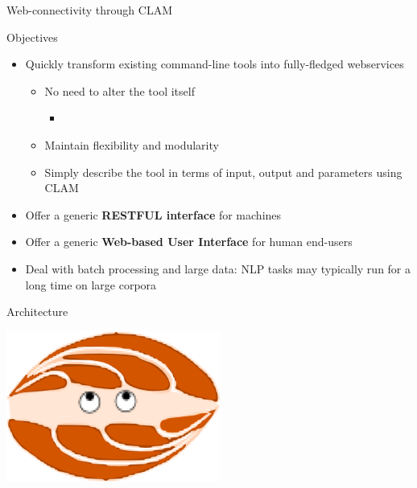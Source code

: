 \documentclass[xcolor=table,10pt,t]{beamer}
\begin{document}
\begin{frame}{Web-connectivity through CLAM}
  \begin{block}{Objectives}
      \begin{itemize}
        \item Quickly transform existing command-line tools into fully-fledged webservices
        \begin{itemize}
            \item No need to alter the tool itself
            \begin{itemize}
                \item {}
            \end{itemize}
            \item Maintain flexibility and modularity
            \item Simply describe the tool in terms of input, output and
                parameters using CLAM
        \end{itemize}
        \item Offer a generic \textbf{RESTFUL interface} for machines
        \item Offer a generic \textbf{Web-based User Interface} for human end-users
        \item Deal with batch processing and large data: NLP tasks may typically run for a
            long time on large corpora
      \end{itemize}
  \end{block}
\end{frame}


\begin{frame}{Architecture}

    \begin{center}
    \includegraphics[width=70.0mm]{clamup.png}
    \end{center}

\end{frame}
\end{document}
